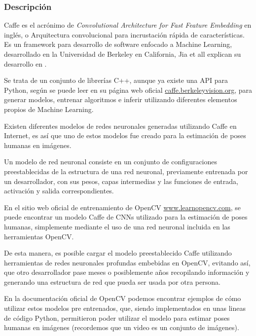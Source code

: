 \documentclass[a4paper,12pt,oneside,spanish]{book}
\begin{document}
\subsubsection{Descripción}
Caffe es el acrónimo de \textit{Convolutional Architecture for Fast Feature Embedding} en inglés, o Arquitectura convolucional para incrustación rápida de características. Es un framework para desarrollo de software enfocado a Machine Learning, desarrollado en la Universidad de Berkeley en California, Jia et all explican su desarrollo en \cite{caffe}.\par 

Se trata de un conjunto de librerías C++, aunque ya existe una API para Python, según se puede leer en su página web oficial \url{caffe.berkeleyvision.org}, para generar modelos, entrenar algoritmos e inferir utilizando diferentes elementos propios de Machine Learning.\par 

Existen diferentes modelos de redes neuronales generadas utilizando Caffe en Internet, es así que uno de estos modelos fue creado para la estimación de poses humanas en imágenes. \par

Un modelo de red neuronal consiste en un conjunto de configuraciones preestablecidas de la estructura de una red neuronal, previamente entrenada por un desarrollador, con sus pesos, capas intermedias y las funciones de entrada, activación y salida correspondientes.\par 

En el sitio web oficial de entrenamiento de OpenCV \url{www.learnopencv.com}, se puede encontrar un modelo Caffe de CNNs utilizado para la estimación de poses humanas, simplemente mediante el uso de una red neuronal incluida en las herramientas OpenCV.\par

De esta manera, es posible cargar el modelo preestablecido Caffe utilizando herramientas de redes neuronales profundas embebidas en OpenCV, evitando así, que otro desarrollador pase meses o posiblemente años recopilando información y generando una estructura de red que pueda ser usada por otra persona.\par

En la documentación oficial de OpenCV podemos encontrar ejemplos de cómo utilizar estos modelos pre entrenados, que, siendo implementados en unas lineas de código Python, permitieron poder utilizar el modelo para estimar poses humanas en imágenes (recordemos que un video es un conjunto de imágenes).
\end{document}
